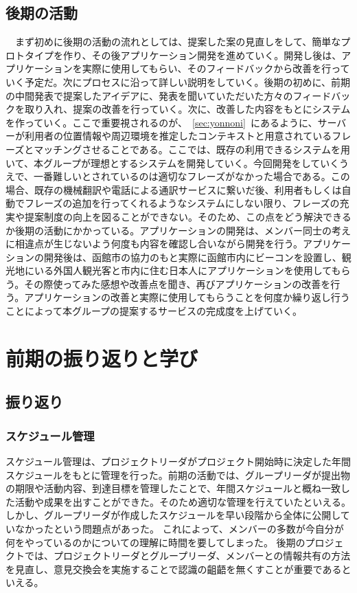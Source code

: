 \documentclass[11pt,papersize]{jsbook}
\begin{document}
\section{後期の活動}
　まず初めに後期の活動の流れとしては、提案した案の見直しをして、簡単なプロトタイプを作り、その後アプリケーション開発を進めていく。開発し後は、アプリケーションを実際に使用してもらい、そのフィードバックから改善を行っていく予定だ。次にプロセスに沿って詳しい説明をしていく。後期の初めに、前期の中間発表で提案したアイデアに、発表を聞いていただいた方々のフィードバックを取り入れ、提案の改善を行っていく。次に、改善した内容をもとにシステムを作っていく。ここで重要視されるのが、~\ref{sec:yonnoni}~にあるように、サーバーが利用者の位置情報や周辺環境を推定したコンテキストと用意されているフレーズとマッチングさせることである。ここでは、既存の利用できるシステムを用いて、本グループが理想とするシステムを開発していく。今回開発をしていくうえで、一番難しいとされているのは適切なフレーズがなかった場合である。この場合、既存の機械翻訳や電話による通訳サービスに繋いだ後、利用者もしくは自動でフレーズの追加を行ってくれるようなシステムにしない限り、フレーズの充実や提案制度の向上を図ることができない。そのため、この点をどう解決できるか後期の活動にかかっている。アプリケーションの開発は、メンバー同士の考えに相違点が生じないよう何度も内容を確認し合いながら開発を行う。アプリケーションの開発後は、函館市の協力のもと実際に函館市内にビーコンを設置し、観光地にいる外国人観光客と市内に住む日本人にアプリケーションを使用してもらう。その際使ってみた感想や改善点を聞き、再びアプリケーションの改善を行う。アプリケーションの改善と実際に使用してもらうことを何度か繰り返し行うことによって本グループの提案するサービスの完成度を上げていく。


\chapter{前期の振り返りと学び}

\section{振り返り}

\subsection{スケジュール管理}
スケジュール管理は、プロジェクトリーダがプロジェクト開始時に決定した年間スケジュールをもとに管理を行った。前期の活動では、グループリーダが提出物の期限や活動内容、到達目標を管理したことで、年間スケジュールと概ね一致した活動や成果を出すことができた。そのため適切な管理を行えていたといえる。
しかし、グループリーダが作成したスケジュールを早い段階から全体に公開していなかったという問題点があった。
これによって、メンバーの多数が今自分が何をやっているのかについての理解に時間を要してしまった。
後期のプロジェクトでは、プロジェクトリーダとグループリーダ、メンバーとの情報共有の方法を見直し、意見交換会を実施することで認識の齟齬を無くすことが重要であるといえる。
\end{document}
